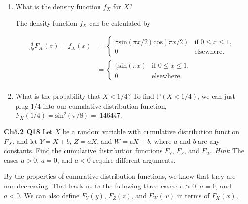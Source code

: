 \documentclass[12pt]{article}
\begin{document}
\begin{enumerate}[label=(\alph*)]
\item What is the density function $f_X$ for $X$?

\noindent
The density function $f_X$ can be calculated by 

\begin{align*}
\frac{d}{dy} F_X(x)  = f_X(x) &= \begin{cases} 
      \pi \text{sin}(\pi x / 2) \text{cos}(\pi x / 2) & \text{if } 0 \leq x \leq 1, \\
      0 & \text{elsewhere}.
      \end{cases} \\
      &= \begin{cases} 
      \frac{\pi}{2} \text{sin}(\pi x) & \text{if } 0 \leq x \leq 1, \\
      0 & \text{elsewhere}.
      \end{cases} \\
\end{align*}


\item What is the probability that $X < 1/4$?
\noindent
To find $\mathbb{P}(X < 1/4)$, we can just plug $1/4$ into our cumulative distribution function, $F_X(1/4) = \text{sin}^2(\pi / 8) = .146447$.

\end{enumerate}


\noindent
\textbf{Ch5.2 Q18} Let $X$ be a random variable with cumulative distribution function $F_X$, and let $Y = X + b$, $Z = aX$, and $W = aX + b$, where $a$ and $b$ are any constants. Find the cumulative distribution functions $F_Y$, $F_Z$, and $F_W$. \textit{Hint}: The cases $a > 0$, $a = 0$, and $a < 0$ require different arguments.

\vspace{.5cm}
\noindent
By the properties of cumulative distribution functions, we know that they are non-decreasing. That leads us to the following three cases: $a > 0$, $a = 0$, and $a < 0$. We can also define $F_Y(y)$, $F_Z(z)$, and $F_W(w)$ in terms of $F_X(x)$,
\end{document}
